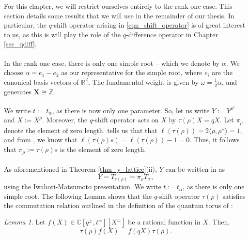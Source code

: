 \documentclass[a4paper]{report}
\theoremstyle{theorem}
\theoremstyle{definition}
\theoremstyle{remark}
\theoremstyle{proposition}
\theoremstyle{conjecture}
\theoremstyle{lemma}
\newtheorem{lemma}{Lemma}
\theoremstyle{corollary}
\theoremstyle{exercise}
\theoremstyle{example}
\newcommand{\C}{\mathbb{C}}
\begin{document}
  For this chapter, we will restrict ourselves entirely to the rank one case.
  This section details some results that we will use in the remainder of our 
  thesis. In particular, the $q$-shift
  operator arising in \eqref{eqn_shift_operator} is of great interest to us, as this is will 
  play the role of the $q$-difference operator in Chapter \ref{sec_qdiff}.\\\\
  In the rank one case, there is only one simple root -- which we denote by 
  $\alpha$. We choose $\alpha = e_1 - e_2$ as our representative for the simple root,
  where $e_i$ are the canonical basis vectors of $\mathbb{R}^2$.
  The fundamental weight 
  is given by $\omega = \frac{1}{2}\alpha$, and generates $\mathbf{X} \cong \mathbb{Z}$.\\\\
  We write $t := t_\alpha$, as there 
  is now only one parameter.
  So, let us write $Y := Y^{\rho^\vee}$ and $X := X^\rho$. Moreover, the $q$-shift operator
  acts on $X$ by $\tau(\rho)X = qX$. Let $\pi_\rho$ denote the element of zero length.
  \cite[Corollary 3.3(i)]{kir97} tells us that that 
  $\ell(\tau(\rho)) = 2\langle \rho,\rho^\vee\rangle = 1$, and from \cite[Corollary 3.3(iv)]{kir97},
  we know that $\ell(\tau(\rho)s) = \ell(\tau(\rho)) - 1 = 0$. Thus, it follows that 
  $\pi_\rho := \tau(\rho)s$ is the element of zero length.\\\\
  As aforementioned in Theorem \ref{thm_y_lattice}(ii), $Y$ can be written in as 
  \begin{equation}\label{eqn_y_iwahori}
      Y = T_{\tau(\rho)} = \pi_\rho T_\alpha,
  \end{equation}
  using the Iwahori-Matsumoto presentation. We write $t := t_\alpha$, as there is only one simple root.
  The following Lemma shows that the $q$-shift operator $\tau(\rho)$ satisfies the commutation relation 
  outlined in the definition of the quantum torus of \cite{beg00}:
  \begin{lemma}\label{lem_comm_relation}
      Let $f(X) \in \C[q^\pm,t^\pm][X^\pm]$ be a rational function in $X$. Then,
      $$\tau(\rho) f(X) = f(qX) \tau(\rho).$$
  \end{lemma}
  
\end{document}
